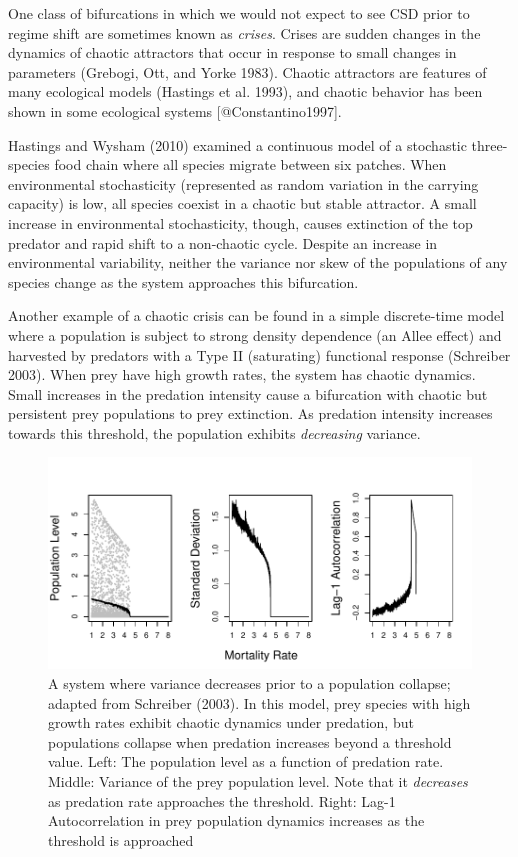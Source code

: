\documentclass[author-year, review]{elsarticle} %
\makeatletter
\def\maxwidth{\ifdim\Gin@nat@width>\linewidth\linewidth
\else\Gin@nat@width\fi}
\let\Oldincludegraphics\includegraphics
\renewcommand{\includegraphics}[1]{\Oldincludegraphics[width=\maxwidth]{#1}}
\makeatother
\begin{document}
One class of bifurcations in which we would not expect to see CSD prior
to regime shift are sometimes known as \emph{crises}. Crises are sudden
changes in the dynamics of chaotic attractors that occur in response to
small changes in parameters (Grebogi, Ott, and Yorke 1983). Chaotic
attractors are features of many ecological models (Hastings et al.
1993), and chaotic behavior has been shown in some ecological systems
{[}@Constantino1997{]}.

Hastings and Wysham (2010) examined a continuous model of a stochastic
three-species food chain where all species migrate between six patches.
When environmental stochasticity (represented as random variation in the
carrying capacity) is low, all species coexist in a chaotic but stable
attractor. A small increase in environmental stochasticity, though,
causes extinction of the top predator and rapid shift to a non-chaotic
cycle. Despite an increase in environmental variability, neither the
variance nor skew of the populations of any species change as the system
approaches this bifurcation.

Another example of a chaotic crisis can be found in a simple
discrete-time model where a population is subject to strong density
dependence (an Allee effect) and harvested by predators with a Type II
(saturating) functional response (Schreiber 2003). When prey have high
growth rates, the system has chaotic dynamics. Small increases in the
predation intensity cause a bifurcation with chaotic but persistent prey
populations to prey extinction. As predation intensity increases towards
this threshold, the population exhibits \emph{decreasing} variance.

\begin{figure}[htbp]
\centering
\includegraphics{schreiber-fig.pdf}
\caption{A system where variance decreases prior to a population
collapse; adapted from Schreiber (2003). In this model, prey species
with high growth rates exhibit chaotic dynamics under predation, but
populations collapse when predation increases beyond a threshold value.
Left: The population level as a function of predation rate. Middle:
Variance of the prey population level. Note that it \emph{decreases} as
predation rate approaches the threshold. Right: Lag-1 Autocorrelation in
prey population dynamics increases as the threshold is approached}
\end{figure}
\end{document}
